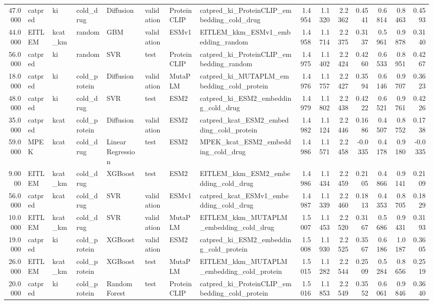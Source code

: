 \begin{tabular}{rlllllllrrrrrrr}
47.0000 & catpred & ki & cold_drug & Diffusion & validation & ProteinCLIP & catpred_ki_ProteinCLIP_embedding_cold_drug & 1.4954 & 1.1320 & 2.2362 & 0.4541 & 0.6814 & 0.8463 & 0.4593 \\
44.0000 & EITLEM & kcat_km & random & GBM & validation & ESMv1 & EITLEM_kkm_ESMv1_embedding_random & 1.4958 & 1.1714 & 2.2375 & 0.3137 & 0.5961 & 0.9878 & 0.3140 \\
56.0000 & catpred & ki & random & SVR & test & ProteinCLIP & catpred_ki_ProteinCLIP_embedding_random & 1.4975 & 1.1402 & 2.2424 & 0.4260 & 0.6533 & 0.8951 & 0.4267 \\
18.0000 & catpred & ki & cold_protein & Diffusion & validation & MutaPLM & catpred_ki_MUTAPLM_embedding_cold_protein & 1.4976 & 1.1757 & 2.2427 & 0.3594 & 0.6146 & 0.9707 & 0.3623 \\
48.0000 & catpred & ki & cold_drug & SVR & test & ESM2 & catpred_ki_ESM2_embedding_cold_drug & 1.4979 & 1.1802 & 2.2438 & 0.4222 & 0.6521 & 0.9761 & 0.4226 \\
35.0000 & catpred & kcat & cold_protein & Diffusion & validation & ESM2 & catpred_kcat_ESM2_embedding_cold_protein & 1.4982 & 1.1124 & 2.2446 & 0.1686 & 0.4507 & 0.8752 & 0.1738 \\
59.0000 & MPEK & kcat & cold_drug & Linear Regression & test & ESM2 & MPEK_kcat_ESM2_embedding_cold_drug & 1.4986 & 1.1571 & 2.2458 & -0.0335 & 0.4178 & 0.9180 & -0.0335 \\
9.0000 & EITLEM & kcat_km & cold_drug & XGBoost & test & ESM2 & EITLEM_kkm_ESM2_embedding_cold_drug & 1.4986 & 1.1434 & 2.2459 & 0.2105 & 0.4866 & 0.9141 & 0.2109 \\
56.0000 & catpred & kcat & cold_drug & SVR & validation & ESMv1 & catpred_kcat_ESMv1_embedding_cold_drug & 1.4987 & 1.1339 & 2.2460 & 0.1813 & 0.4353 & 0.8705 & 0.1829 \\
10.0000 & EITLEM & kcat_km & cold_drug & SVR & validation & MutaPLM & EITLEM_kkm_MUTAPLM_embedding_cold_drug & 1.5007 & 1.1453 & 2.2520 & 0.3167 & 0.5686 & 0.9431 & 0.3193 \\
19.0000 & catpred & ki & cold_protein & XGBoost & validation & ESM2 & catpred_ki_ESM2_embedding_cold_protein & 1.5008 & 1.1930 & 2.2525 & 0.3567 & 0.6186 & 1.0187 & 0.3605 \\
26.0000 & EITLEM & kcat_km & cold_protein & XGBoost & test & MutaPLM & EITLEM_kkm_MUTAPLM_embedding_cold_protein & 1.5015 & 1.1282 & 2.2544 & 0.2509 & 0.5284 & 0.8656 & 0.2519 \\
20.0000 & catpred & ki & cold_protein & Random Forest & test & ProteinCLIP & catpred_ki_ProteinCLIP_embedding_cold_protein & 1.5016 & 1.1853 & 2.2549 & 0.3552 & 0.6061 & 0.9846 & 0.3640 \\

\end{tabular}
